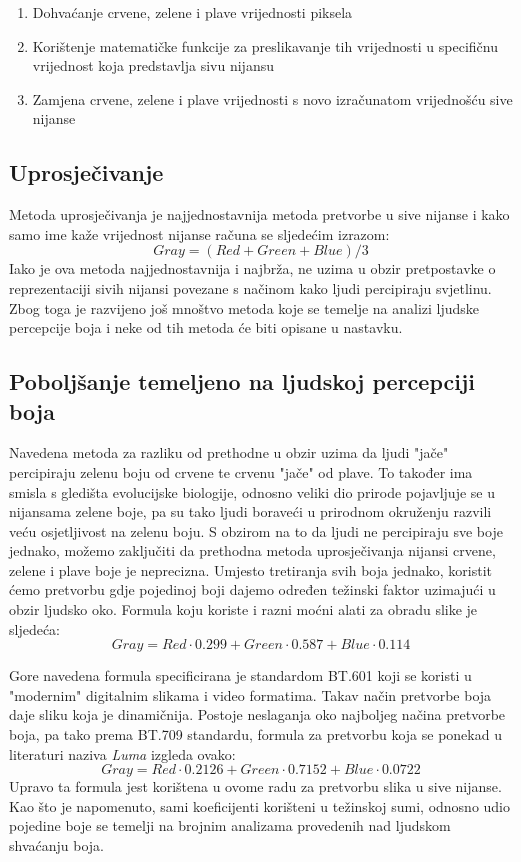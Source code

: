 \documentclass[times, utf8, diplomski]{fer}
\theoremstyle{definition}
\begin{document}
\begin{enumerate}
\item Dohvaćanje crvene, zelene i plave vrijednosti piksela
\item Korištenje matematičke funkcije za preslikavanje tih vrijednosti u specifičnu vrijednost koja predstavlja sivu nijansu
\item Zamjena crvene, zelene i plave vrijednosti s novo izračunatom vrijednošću sive nijanse
\end{enumerate}

\subsection{Uprosječivanje}
Metoda uprosječivanja je najjednostavnija metoda pretvorbe u sive nijanse i kako samo ime kaže vrijednost nijanse računa se sljedećim izrazom:
\begin{equation}
Gray = (Red + Green + Blue) / 3
\end{equation}
Iako je ova metoda najjednostavnija i najbrža, ne uzima u obzir pretpostavke o reprezentaciji sivih nijansi povezane s načinom kako ljudi percipiraju svjetlinu. Zbog toga je razvijeno još mnoštvo metoda koje se temelje na analizi ljudske percepcije boja i neke od tih metoda će biti opisane u nastavku.

\subsection{Poboljšanje temeljeno na ljudskoj percepciji boja}
Navedena metoda za razliku od prethodne u obzir uzima da ljudi "jače" percipiraju zelenu boju od crvene te crvenu "jače" od plave. To također ima smisla s gledišta evolucijske biologije, odnosno veliki dio prirode pojavljuje se u nijansama zelene boje, pa su tako ljudi boraveći u prirodnom okruženju razvili veću osjetljivost na zelenu boju. S obzirom na to da ljudi ne percipiraju sve boje jednako, možemo zaključiti da prethodna metoda uprosječivanja nijansi crvene, zelene i plave boje je neprecizna.
Umjesto tretiranja svih boja jednako, koristit ćemo pretvorbu gdje pojedinoj boji dajemo određen težinski faktor uzimajući u obzir ljudsko oko. Formula koju koriste i razni moćni alati za obradu slike je sljedeća:
\begin{equation}
Gray = Red \cdot 0.299 + Green \cdot 0.587 + Blue \cdot 0.114
\end{equation}

Gore navedena formula specificirana je standardom BT.601 koji se koristi u "modernim" digitalnim slikama i video formatima. Takav način pretvorbe boja daje sliku koja je dinamičnija.
Postoje neslaganja oko najboljeg načina pretvorbe boja, pa tako prema BT.709 standardu, formula za pretvorbu koja se ponekad u literaturi naziva \textit{Luma} izgleda ovako:
\begin{equation}
Gray = Red \cdot 0.2126 + Green \cdot 0.7152 + Blue \cdot 0.0722
\end{equation}
Upravo ta formula jest korištena u ovome radu za pretvorbu slika u sive nijanse.
Kao što je napomenuto, sami koeficijenti korišteni u težinskoj sumi, odnosno udio pojedine boje se temelji na brojnim analizama provedenih nad ljudskom shvaćanju boja.
\end{document}
